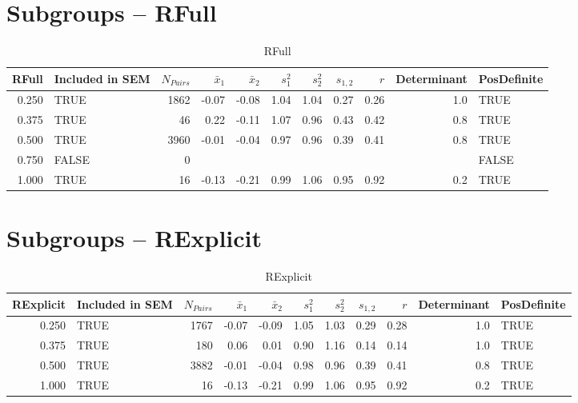 \documentclass{article}\usepackage[]{graphicx}\usepackage[]{color}
\begin{document}
\section{Subgroups --  RFull }%
\begin{table}[ht]
\centering
\begin{tabular}{rlrrrrrrrrl}
  \hline
RFull & Included in SEM & $N_{Pairs}$ & $\bar{x}_1$ & $\bar{x}_2$ & $s_1^2$ & $s_2^2$ & $s_{1,2}$ & $r$ & Determinant & PosDefinite \\ 
  \hline
0.250 & TRUE & 1862 & -0.07 & -0.08 & 1.04 & 1.04 & 0.27 & 0.26 & 1.0 & TRUE \\ 
  0.375 & TRUE & 46 & 0.22 & -0.11 & 1.07 & 0.96 & 0.43 & 0.42 & 0.8 & TRUE \\ 
  0.500 & TRUE & 3960 & -0.01 & -0.04 & 0.97 & 0.96 & 0.39 & 0.41 & 0.8 & TRUE \\ 
  0.750 & FALSE & 0 &  &  &  &  &  &  &  & FALSE \\ 
  1.000 & TRUE & 16 & -0.13 & -0.21 & 0.99 & 1.06 & 0.95 & 0.92 & 0.2 & TRUE \\ 
   \hline
\end{tabular}
\caption{RFull} 
\end{table}
\section{Subgroups --  RExplicit }%
\begin{table}[ht]
\centering
\begin{tabular}{rlrrrrrrrrl}
  \hline
RExplicit & Included in SEM & $N_{Pairs}$ & $\bar{x}_1$ & $\bar{x}_2$ & $s_1^2$ & $s_2^2$ & $s_{1,2}$ & $r$ & Determinant & PosDefinite \\ 
  \hline
0.250 & TRUE & 1767 & -0.07 & -0.09 & 1.05 & 1.03 & 0.29 & 0.28 & 1.0 & TRUE \\ 
  0.375 & TRUE & 180 & 0.06 & 0.01 & 0.90 & 1.16 & 0.14 & 0.14 & 1.0 & TRUE \\ 
  0.500 & TRUE & 3882 & -0.01 & -0.04 & 0.98 & 0.96 & 0.39 & 0.41 & 0.8 & TRUE \\ 
  1.000 & TRUE & 16 & -0.13 & -0.21 & 0.99 & 1.06 & 0.95 & 0.92 & 0.2 & TRUE \\ 
   \hline
\end{tabular}
\caption{RExplicit} 
\end{table}
\end{document}
